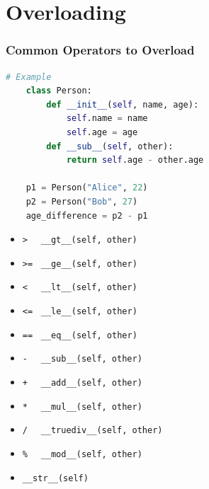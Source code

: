 \documentclass{beamer}
\begin{document}
\section{Overloading}

%
%
\begin{frame}[fragile]
    \frametitle{Common Operators to Overload}
    \begin{lstlisting}[language=Python, autogobble, basicstyle=\tiny]
    # Example
    class Person:
        def __init__(self, name, age):
            self.name = name
            self.age = age
        def __sub__(self, other):
            return self.age - other.age

    p1 = Person("Alice", 22)
    p2 = Person("Bob", 27)
    age_difference = p2 - p1
    \end{lstlisting}
    \vfill
    \begin{minipage}{0.49\textwidth}
    \begin{itemize}
        \item \lstinline|>| \ \textrightarrow \ \lstinline|__gt__(self, other)| 
        \item \lstinline|>=| \textrightarrow \ \lstinline|__ge__(self, other)|
        \item \lstinline|<| \ \textrightarrow \ \lstinline|__lt__(self, other)|
        \item \lstinline|<=| \textrightarrow \ \lstinline|__le__(self, other)|
        \item \lstinline|==| \textrightarrow \ \lstinline|__eq__(self, other)|
    \end{itemize}
    \end{minipage}
    \hfill
    \begin{minipage}{0.49\textwidth}
    \begin{itemize}
        \item \lstinline|-| \ \textrightarrow \ \lstinline|__sub__(self, other)|
        \item \lstinline|+| \ \textrightarrow \ \lstinline|__add__(self, other)|
        \item \lstinline|*| \ \textrightarrow \ \lstinline|__mul__(self, other)|
        \item \lstinline|/| \ \textrightarrow \ \lstinline|__truediv__(self, other)|
        \item \lstinline|%| \ \textrightarrow \ \lstinline|__mod__(self, other)|
        \item \lstinline|__str__(self)|
    \end{itemize}
    \end{minipage}
\end{frame}
\end{document}
